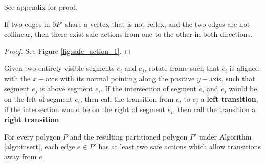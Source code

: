 \documentclass[]{styles/svproc}  %
\begin{document}
See appendix for proof.

\begin{corollary} \label{coro:neighbor}
If two edges in $\partial P'$ share a vertex that is not reflex, and the two
 edges are not collinear, then there exist safe actions
from one to the other in both directions.
\end{corollary}

\begin{proof}
See Figure \ref{fig:safe_action_1}.
\end{proof}

\begin{definition}
Given two entirely visible segments $e_i$ and $e_j$,
rotate frame such that $e_i$ is aligned with the $x-$axis with its normal pointing
along the positive $y-$axis, such that 
segment $e_j$ is above segment $e_i$. If the intersection of segment $e_i$ and
$e_j$ would be on the left of segment $e_i$, then call the transition from $e_i$ to $e_j$ a
\textbf{left
transition}; if the intersection would be on the right of segment $e_i$, then call the
transition a \textbf{right transition}.
\end{definition}

\begin{proposition} \label{prop:twosafe}
For every polygon $P$ and the resulting partitioned polygon $P'$ under Algorithm
\ref{algo:insert}, each edge $e \in P'$ has at least two safe actions which allow
transitions away from $e$.
\end{proposition}
\end{document}
